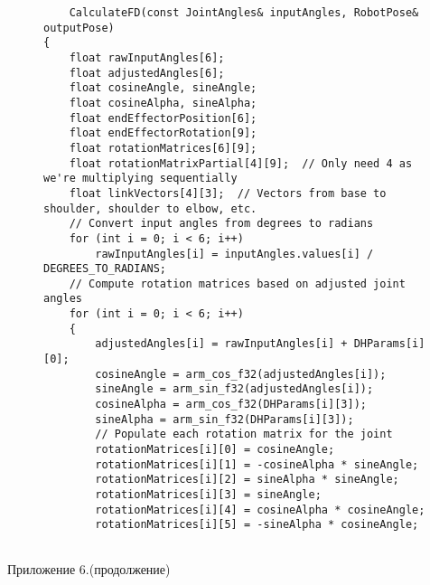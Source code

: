 \begin{figure}[H]
	\centering
	\begin{verbatim}
	CalculateFD(const JointAngles& inputAngles, RobotPose& outputPose)
{
    float rawInputAngles[6];
    float adjustedAngles[6];
    float cosineAngle, sineAngle;
    float cosineAlpha, sineAlpha;
    float endEffectorPosition[6];
    float endEffectorRotation[9];
    float rotationMatrices[6][9];
    float rotationMatrixPartial[4][9];  // Only need 4 as we're multiplying sequentially
    float linkVectors[4][3];  // Vectors from base to shoulder, shoulder to elbow, etc.
    // Convert input angles from degrees to radians
    for (int i = 0; i < 6; i++)
        rawInputAngles[i] = inputAngles.values[i] / DEGREES_TO_RADIANS;
    // Compute rotation matrices based on adjusted joint angles
    for (int i = 0; i < 6; i++)
    {
        adjustedAngles[i] = rawInputAngles[i] + DHParams[i][0];
        cosineAngle = arm_cos_f32(adjustedAngles[i]);
        sineAngle = arm_sin_f32(adjustedAngles[i]);
        cosineAlpha = arm_cos_f32(DHParams[i][3]);
        sineAlpha = arm_sin_f32(DHParams[i][3]);
        // Populate each rotation matrix for the joint
        rotationMatrices[i][0] = cosineAngle;
        rotationMatrices[i][1] = -cosineAlpha * sineAngle;
        rotationMatrices[i][2] = sineAlpha * sineAngle;
        rotationMatrices[i][3] = sineAngle;
        rotationMatrices[i][4] = cosineAlpha * cosineAngle;
        rotationMatrices[i][5] = -sineAlpha * cosineAngle;
      
	\end{verbatim}
\end{figure}
\newpage
\hfill \large Приложение 6.(продолжение)
